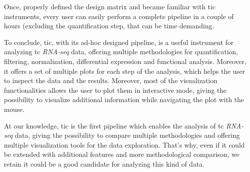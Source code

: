 Once, properly defined the design matrix and became familiar with \gls{tic} instruments, every user can easily perform a complete pipeline in a couple of hours (excluding the quantification step, that can be time demanding.

To conclude, \gls{tic}, with its ad-hoc designed pipeline, is a useful instrument for analyzing \gls{tc} \textit{RNA-seq} data, offering multiple methodologies for quantification, filtering, normalization, differential expression and functional analysis.
Moreover, it offers a set of multiple plots for each step of the analysis, which helps the user to inspect the data and the results.
Moreover, most of the visualization functionalities allows the user to plot them in interactive mode, giving the possibility to visualize additional information while navigating the plot with the mouse.

At our knowledge, \gls{tic} is the first pipeline which enables the analysis of \gls{tc} \textit{RNA-seq} data, giving the possibility to compare multiple methodologies and offering multiple visualization tools for the data exploration.
That's why, even if it could be extended with additional features and more methodological comparison, we retain it could be a good candidate for analyzing this kind of data.


